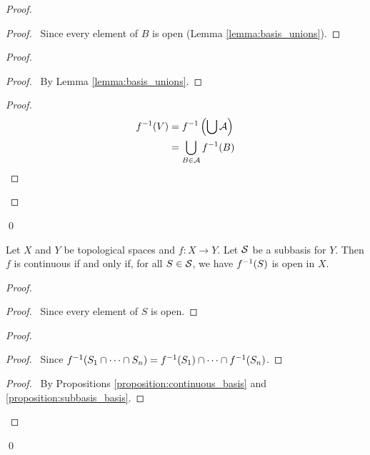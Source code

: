 \begin{proof}
    \pf
    \begin{proof}
        \pf\ Since every element of $B$ is open (Lemma \ref{lemma:basis_unions}).
    \end{proof}
    \begin{proof}
        \begin{proof}
            \pf\ By Lemma \ref{lemma:basis_unions}.
        \end{proof}
        \begin{proof}
            \pf
            \begin{align*}
                {f}^{-1}(V) & = {f}^{-1} \left( \bigcup \mathcal{A} \right) \\
                & = \bigcup_{B \in \mathcal{A}} {f}^{-1}(B)
            \end{align*}
        \end{proof}
    \end{proof}
    \qed
\end{proof}

\begin{proposition}
    \label{proposition:continuous_subbasis}
    Let $X$ and $Y$ be topological spaces and $f : X \rightarrow Y$. Let $\mathcal{S}$ be a subbasis for $Y$. Then $f$
    is continuous if and only if, for all $S \in \mathcal{S}$, we have ${f}^{-1}(S)$ is open in $X$.
\end{proposition}

\begin{proof}
    \pf
    \begin{proof}
        \pf\ Since every element of $S$ is open.
    \end{proof}
    \begin{proof}
        \begin{proof}
            \pf\ Since ${f}^{-1}(S_1 \cap \cdots \cap S_n) = {f}^{-1}(S_1) \cap \cdots \cap {f}^{-1}(S_n)$.
        \end{proof}
        \qedstep
        \begin{proof}
            \pf\ By Propositions \ref{proposition:continuous_basis} and \ref{proposition:subbasis_basis}.
        \end{proof}
    \end{proof}
    \qed
\end{proof}

